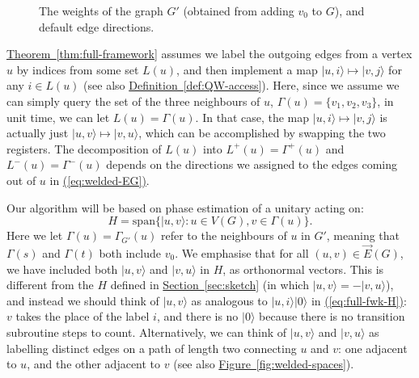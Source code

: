 \documentclass{article}
\newcommand{\eq}[1]{\hyperref[eq:#1]{(\ref*{eq:#1})}}
\renewcommand{\sec}[1]{\hyperref[sec:#1]{Section~\ref*{sec:#1}}}
\newcommand{\thm}[1]{\hyperref[thm:#1]{Theorem~\ref*{thm:#1}}}
\newcommand{\defin}[1]{\hyperref[def:#1]{Definition~\ref*{def:#1}}}
\newcommand{\fig}[1]{\hyperref[fig:#1]{Figure~\ref*{fig:#1}}}
\def\ket#1{{\lvert}#1\rangle}
\renewcommand{\>}{\rangle}
\newcommand{\<}{\langle}
\renewcommand{\(}{\left(}
\renewcommand{\)}{\right)}
\begin{document}
\begin{figure}
\caption{The weights of the graph $G'$ (obtained from adding $v_0$ to $G$), and default edge directions.}\label{fig:welded-trees-weights}
\end{figure}


\thm{full-framework} assumes we label the outgoing edges from a vertex $u$ by indices from some set $L(u)$, and then implement a map $\ket{u,i}\mapsto \ket{v,j}$ for any $i\in L(u)$ (see also \defin{QW-access}). Here, since we assume we can simply query the set of the three neighbours of $u$, $\Gamma(u)=\{v_1,v_2,v_3\}$, in unit time, we can let $L(u)=\Gamma(u)$. In that case, the map $\ket{u,i}\mapsto\ket{v,j}$ is actually just $\ket{u,v}\mapsto \ket{v,u}$, which can be accomplished by swapping the two registers. The decomposition of $L(u)$ into $L^+(u)=\Gamma^+(u)$ and $L^-(u)=\Gamma^-(u)$ depends on the directions we assigned to the edges coming out of $u$ in \eq{welded-EG}. 

Our algorithm will be based on phase estimation of a unitary acting on:
\begin{equation}
H=\mathrm{span}\{\ket{u,v}:u\in V(G),v\in\Gamma(u)\}.\label{eq:welded-H}
\end{equation}
Here we let $\Gamma(u)=\Gamma_{G'}(u)$ refer to the neighbours of $u$ in $G'$, meaning that $\Gamma(s)$ and $\Gamma(t)$ both include $v_0$. We emphasise that for all $(u,v)\in \overrightarrow{E}(G)$, we have included both $\ket{u,v}$ and $\ket{v,u}$ in $H$, as orthonormal vectors. This is different from the $H$ defined in \sec{sketch} (in which $\ket{u,v}=-\ket{v,u}$), and instead we should think of $\ket{u,v}$ as analogous to $\ket{u,i}\ket{0}$ in \eq{full-fwk-H}: $v$ takes the place of the label $i$, and there is no $\ket{0}$ because there is no transition subroutine steps to count. Alternatively, we can think of $\ket{u,v}$ and $\ket{v,u}$ as labelling distinct edges on a path of length two connecting $u$ and $v$: one adjacent to $u$, and the other adjacent to $v$ (see also \fig{welded-spaces}).
\end{document}
